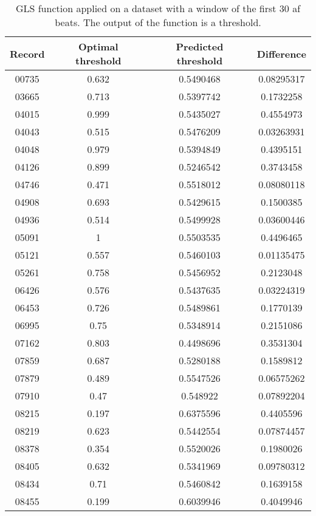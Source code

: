 \begin{table}[h]
\begin{center}
\begin{threeparttable}
\caption{GLS function applied on a dataset with a window of the first 30 af beats. The output of the function is a threshold.}
\label{table:clustering_ml}
\scriptsize
  \begin{tabular}{c c c c}
  \toprule
  \textbf{Record} & \textbf{Optimal threshold} & \textbf{Predicted threshold} & \textbf{Difference} \\
  \midrule  
  00735 & 0.632 & 0.5490468 & 0.08295317 \\
  03665 & 0.713 & 0.5397742 & 0.1732258 \\
  04015 & 0.999 & 0.5435027 & 0.4554973 \\
  04043 & 0.515 & 0.5476209 & 0.03263931 \\
  04048 & 0.979 & 0.5394849 & 0.4395151 \\
  04126 & 0.899 & 0.5246542 & 0.3743458 \\
  04746 & 0.471 & 0.5518012 & 0.08080118 \\
  04908 & 0.693 & 0.5429615 & 0.1500385 \\
  04936 & 0.514 & 0.5499928 & 0.03600446 \\
  05091 & 1 & 0.5503535 & 0.4496465 \\
  05121 & 0.557 & 0.5460103 & 0.01135475 \\ 
  05261 & 0.758 & 0.5456952 & 0.2123048 \\
  06426 & 0.576 & 0.5437635 & 0.03224319 \\
  06453 & 0.726 & 0.5489861 & 0.1770139 \\
  06995 & 0.75 & 0.5348914 & 0.2151086 \\
  07162 & 0.803 & 0.4498696 & 0.3531304 \\
  07859 & 0.687 & 0.5280188 & 0.1589812 \\
  07879 & 0.489 & 0.5547526 & 0.06575262 \\
  07910 & 0.47 & 0.548922 & 0.07892204 \\ 
  08215 & 0.197 & 0.6375596 & 0.4405596 \\
  08219 & 0.623 & 0.5442554 & 0.07874457 \\
  08378 & 0.354 & 0.5520026 & 0.1980026 \\
  08405 & 0.632 & 0.5341969 & 0.09780312 \\
  08434 & 0.71 & 0.5460842 & 0.1639158 \\
  08455 & 0.199 & 0.6039946 & 0.4049946 \\
  \bottomrule
\end{tabular}
\end{threeparttable}
\end{center}
\end{table}

